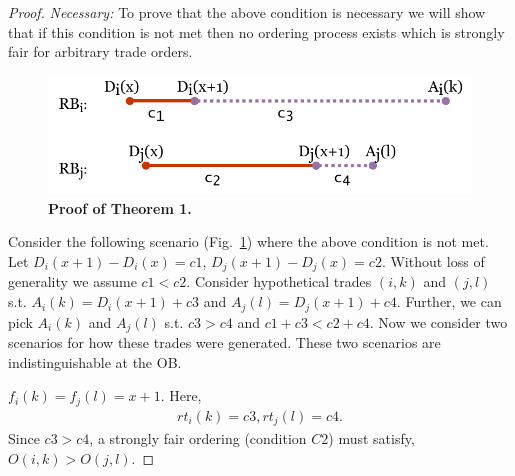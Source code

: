 \documentclass{article}
\newcommand{\Fig}[1]{Fig.~\ref{fig:#1}\xspace}
\begin{document}

\begin{proof}
\textit{Necessary:} To prove that the above condition is necessary we will show that if this condition is not met then no ordering process exists which is strongly fair for arbitrary trade orders. %

\begin{figure}[b]
\centering
    \includegraphics[trim={0 0 0 1mm},clip,width=0.9\columnwidth]{images/delivery times.pdf}
    \vspace{-3mm}
    \caption{{\small{\bf Proof of Theorem 1.}}}%
    \label{fig:proof}
    \vspace{-5mm}
\end{figure}

Consider the following scenario (\Fig{proof}) where the above condition is not met. Let $D_i(x+1) - D_i(x) = c1$, $D_j(x+1) - D_j(x) = c2$. Without loss of generality we assume $c1<c2$. Consider hypothetical trades $(i,k)$ and $(j,l)$ s.t. $A_i(k) = D_i(x+1) + c3$ and $A_j(l) = D_j(x+1) + c4$. Further, we can pick $A_i(k)$ and $A_j(l)$ s.t. $c3>c4$ and $c1+c3<c2+c4$. Now we consider two scenarios for how these trades were generated. These two scenarios are indistinguishable at the OB.

\noindent
{} $f_i(k) = f_j(l) = x+1$. Here,
\begin{align}
rt_i(k) = c3, rt_j(l) = c4.
\end{align}
Since $c3>c4$, a strongly fair ordering (condition $C2$) must satisfy,
$O(i,k) > O(j,l)$.


\end{proof}
\end{document}
